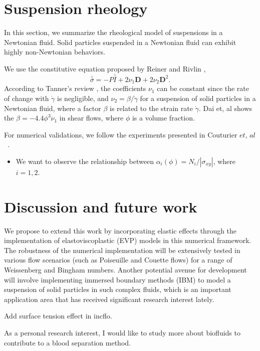 \section{Suspension rheology}
In this section, we summarize the rheological model of suspensions in a Newtonian fluid. Solid particles suspended in a Newtonian fluid can exhibit highly non-Newtonian behaviors.  
\par
We use the constitutive equation proposed by Reiner \cite{reiner_mathematical_1945} and Rivlin \cite{rivlin_stress-deformation_1955},  
\begin{equation}
  \bar{\bar{\sigma}} = -P \bar{\bar{I}}
  + 2 \nu_1 {\bm{D}} + 2 \nu_2 {\bm{D}}^2.
\end{equation}
According to Tanner's review \cite{tanner_review_2018}, the coefficients $\nu_1$ can be constant since the rate of change with $\dot{\gamma}$ is negligible, and $\nu_2 = \beta / \dot{\gamma}$ for a suspension of solid particles in a Newtonian fluid, where a factor $\beta$ is related to the strain rate $\dot{\gamma}$. Dai et, al \cite{dai_viscometric_2013} shows the $\beta = -4.4 \phi^3 \nu_1$ in shear flows, where $\phi$ is a volume fraction. 
\par
For numerical validations, we follow the experiments presented in Couturier $\textit{et, al}$~\cite{couturier_suspensions_2011}.
\begin{itemize}
  \item We want to observe the relationship between $\alpha_i(\phi) = N_i / |\sigma_{xy}|$, where $i = 1,2$.
\end{itemize}




\section{Discussion and future work}
We propose to extend this work by incorporating elastic effects through the implementation of elastoviscoplastic (EVP) models in this numerical framework. The robustness of the numerical implementation will be extensively tested in various flow scenarios (such as Poiseuille and Couette flows) for a range of Weissenberg and Bingham numbers.  Another potential avenue for development will involve implementing immersed boundary methods (IBM) to model a suspension of solid particles in such complex fluids, which is an important application area that has received significant research interest lately. 
\par
Add surface tension effect in incflo. 
\par 
As a personal research interest, I would like to study more about biofluids to contribute to a blood separation method. 